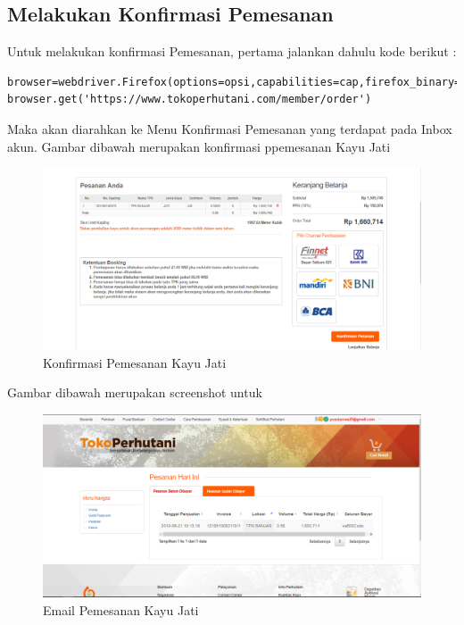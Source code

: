 \newpage
\subsection {Melakukan Konfirmasi Pemesanan}
Untuk melakukan konfirmasi Pemesanan, pertama jalankan dahulu kode berikut :
\begin{verbatim}
browser=webdriver.Firefox(options=opsi,capabilities=cap,firefox_binary=binary)
browser.get('https://www.tokoperhutani.com/member/order')
\end{verbatim}

Maka akan diarahkan ke Menu Konfirmasi Pemesanan yang terdapat pada Inbox akun.
Gambar dibawah merupakan konfirmasi ppemesanan Kayu Jati
\begin{figure}[h]
	\centering
	\includegraphics[scale=0.25]{figures/T6_1}
	\caption{Konfirmasi Pemesanan Kayu Jati}
\end{figure}

Gambar dibawah merupakan screenshot untuk
\begin{figure}[h]
	\centering
	\includegraphics[scale=0.25]{figures/T6_2}
	\caption{Email Pemesanan Kayu Jati}
\end{figure}







